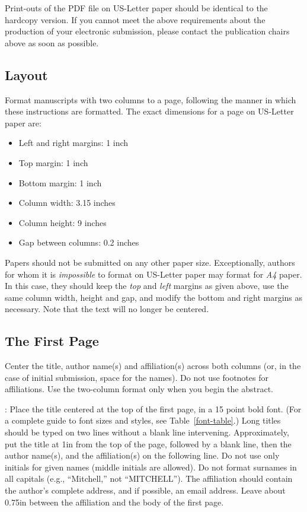 \documentclass[11pt,letterpaper]{article}
\begin{document}
Print-outs of the PDF file on US-Letter paper should be identical to the
hardcopy version.  If you cannot meet the above requirements about the
production of your electronic submission, please contact the
publication chairs above  as soon as possible.

\subsection{Layout}
\label{ssec:layout}

Format manuscripts with two columns to a page, following the manner in
which these instructions are formatted. The exact dimensions for a page
on US-Letter paper are:

\begin{itemize}
\item Left and right margins: 1 inch
\item Top margin: 1 inch
\item Bottom margin: 1 inch
\item Column width: 3.15 inches
\item Column height: 9 inches
\item Gap between columns: 0.2 inches
\end{itemize}

\noindent Papers should not be submitted on any other paper size.
Exceptionally, authors for whom it is \emph{impossible} to format on
US-Letter paper may format for \emph{A4} paper. In this case, they should
keep the \emph{top} and \emph{left} margins as given above, use the same
column width, height and gap, and modify the bottom and right margins as
necessary. Note that the text will no longer be centered.

\subsection{The First Page}
\label{ssec:first}

Center the title, author name(s) and affiliation(s) across both
columns (or, in the case of initial submission, space for the names). 
Do not use footnotes for affiliations.  
Use the two-column format only when you begin the abstract.

: Place the title centered at the top of the first
page, in a 15 point bold font.  (For a complete guide to font sizes and
styles, see Table~\ref{font-table}.) Long titles should be typed on two
lines without a blank line intervening. Approximately, put the title at
1in from the top of the page, followed by a blank line, then the author
name(s), and the affiliation(s) on the following line.  Do not use only
initials for given names (middle initials are allowed). Do not format
surnames in all capitals (e.g., ``Mitchell,'' not ``MITCHELL'').  The
affiliation should contain the author's complete address, and if possible,
an email address. Leave about 0.75in between the affiliation and the body
of the first page.
\end{document}
